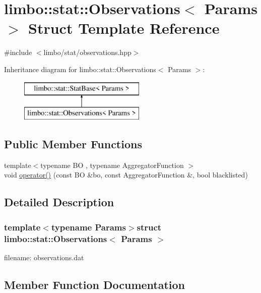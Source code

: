 \hypertarget{structlimbo_1_1stat_1_1_observations}{}\section{limbo\+:\+:stat\+:\+:Observations$<$ Params $>$ Struct Template Reference}
\label{structlimbo_1_1stat_1_1_observations}


{\ttfamily \#include $<$limbo/stat/observations.\+hpp$>$}

Inheritance diagram for limbo\+:\+:stat\+:\+:Observations$<$ Params $>$\+:\begin{figure}[H]
\begin{center}
\leavevmode
\includegraphics[height=2.000000cm]{structlimbo_1_1stat_1_1_observations}
\end{center}
\end{figure}
\subsection*{Public Member Functions}
\begin{DoxyCompactItemize}
\item 
{\footnotesize template$<$typename B\+O , typename Aggregator\+Function $>$ }\\void \hyperlink{structlimbo_1_1stat_1_1_observations_a7da8caabd4bc846a6bc17c08b8b1e5ad}{operator()} (const B\+O \&bo, const Aggregator\+Function \&, bool blacklisted)
\end{DoxyCompactItemize}


\subsection{Detailed Description}
\subsubsection*{template$<$typename Params$>$struct limbo\+::stat\+::\+Observations$<$ Params $>$}

filename\+: {\ttfamily observations.\+dat} 

\subsection{Member Function Documentation}
\hypertarget{structlimbo_1_1stat_1_1_observations_a7da8caabd4bc846a6bc17c08b8b1e5ad}{}
